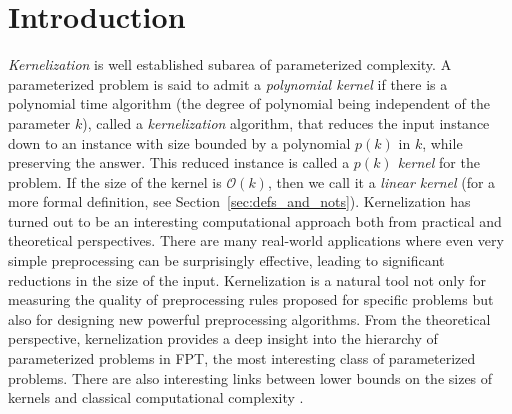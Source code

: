 \documentclass[11pt]{article}
\newcommand{\cO}{\mathcal{O}}
\begin{document}




\maketitle



\section{Introduction}
{\em Kernelization} is well established subarea of parameterized complexity. 
 A parameterized problem is said to admit a {\em polynomial kernel} if there is a polynomial time algorithm (the degree of polynomial being independent of the parameter $k$), called a {\em kernelization} algorithm, that reduces the input instance down to an instance with size bounded by a polynomial $p(k)$ in $k$, while preserving the answer. This reduced instance is called a {\em $p(k)$ kernel} for the problem. If the size of the kernel is $\cO(k)$, then we call it a {\em linear kernel} (for a more formal definition, see Section~\ref{sec:defs_and_nots}). Kernelization has turned out to  be an interesting computational approach both from practical and theoretical perspectives. There are many real-world applications where even very simple preprocessing can be surprisingly effective, leading to significant reductions  in the size of the input. Kernelization is a natural tool not only for  measuring the quality of preprocessing rules proposed for  specific problems but also for designing new powerful preprocessing algorithms. From the theoretical perspective, kernelization provides a deep insight into the hierarchy of parameterized problems in  {\sf FPT}, the most interesting class of parameterized problems.  There are also interesting links  
  between lower bounds on the sizes of kernels and classical computational complexity  \cite{BDFH08,Dell:2010sh,DruckerA12}. 
 
 
 
\end{document}
